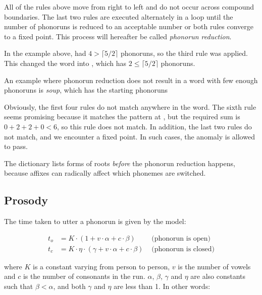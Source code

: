 \documentclass{book}
\begin{document}
All of the rules above move from right to left and do not occur across compound boundaries. The last two rules are executed alternately in a loop until the number of phonoruns is reduced to an acceptable number or both rules converge to a fixed point. This process will hereafter be called \emph{phonorun reduction}.

In the example above,  had $4 > \lceil 5 / 2 \rceil$ phonoruns, so the third rule was applied. This changed the word into , which has $2 \le \lceil 5 / 2 \rceil$ phonoruns.

An example where phonorun reduction does not result in a word with few enough phonoruns is  \emph{soup}, which has the starting phonoruns

\begin{center}
\end{center}

Obviously, the first four rules do not match anywhere in the word. The sixth rule seems promising because it matches the pattern at , but the required sum is $0 + 2 + 2 + 0 < 6$, so this rule does not match. In addition, the last two rules do not match, and we encounter a fixed point. In such cases, the anomaly is allowed to pass.

The dictionary lists forms of roots \emph{before} the phonorun reduction happens, because affixes can radically affect which phonemes are switched.

\subsection{Prosody}

The time taken to utter a phonorun is given by the model:

\begin{align}
  t_o &= K \cdot (1 + v \cdot \alpha + c \cdot \beta) & \text{ (phonorun is open)} \\
  t_c &= K \cdot \eta \cdot (\gamma + v \cdot \alpha + c \cdot \beta) & \text{ (phonorun is closed)}
\end{align}

where $K$ is a constant varying from person to person, $v$ is the number of vowels and $c$ is the number of consonants in the run. $\alpha$, $\beta$, $\gamma$ and $\eta$ are also constants such that $\beta < \alpha$, and both $\gamma$ and $\eta$ are less than 1. In other words:
\end{document}
